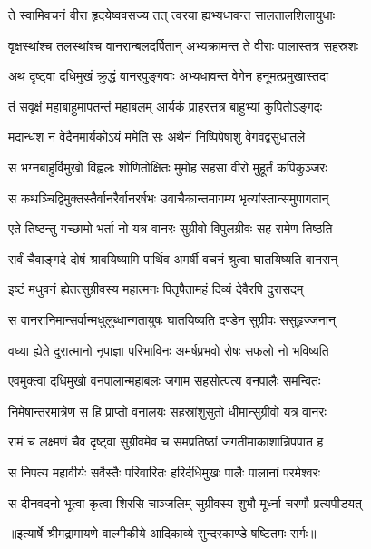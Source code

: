 \twolineshloka
{ते स्वामिवचनं वीरा हृदयेष्ववसज्य तत्}
{त्वरया ह्यभ्यधावन्त सालतालशिलायुधाः} %

\twolineshloka
{वृक्षस्थांश्च तलस्थांश्च वानरान्बलदर्पितान्}
{अभ्यक्रामन्त ते वीराः पालास्तत्र सहस्रशः} %

\twolineshloka
{अथ दृष्ट्वा दधिमुखं क्रुद्धं वानरपुङ्गवाः}
{अभ्यधावन्त वेगेन हनूमत्प्रमुखास्तदा} %

\twolineshloka
{तं सवृक्षं महाबाहुमापतन्तं महाबलम्}
{आर्यकं प्राहरत्तत्र बाहुभ्यां कुपितोऽङ्गदः} %

\twolineshloka
{मदान्धश न वेदैनमार्यकोऽयं ममेति सः}
{अथैनं निष्पिपेषाशु वेगवद्वसुधातले} %

\twolineshloka
{स भग्नबाहुर्विमुखो विह्वलः शोणितोक्षितः}
{मुमोह सहसा वीरो मुहूर्तं कपिकुञ्जरः} %

\twolineshloka
{स कथञ्चिद्विमुक्तस्तैर्वानरैर्वानरर्षभः}
{उवाचैकान्तमागम्य भृत्यांस्तान्समुपागतान्} %

\twolineshloka
{एते तिष्ठन्तु गच्छामो भर्ता नो यत्र वानरः}
{सुग्रीवो विपुलग्रीवः सह रामेण तिष्ठति} %

\twolineshloka
{सर्वं चैवाङ्गदे दोषं श्रावयिष्यामि पार्थिव}
{अमर्षी वचनं श्रुत्वा घातयिष्यति वानरान्} %

\twolineshloka
{इष्टं मधुवनं ह्येतत्सुग्रीवस्य महात्मनः}
{पितृपैतामहं दिव्यं देवैरपि दुरासदम्} %

\twolineshloka
{स वानरानिमान्सर्वान्मधुलुब्धान्गतायुषः}
{घातयिष्यति दण्डेन सुग्रीवः ससुहृज्जनान्} %

\twolineshloka
{वध्या ह्येते दुरात्मानो नृपाज्ञा परिभाविनः}
{अमर्षप्रभवो रोषः सफलो नो भविष्यति} %

\twolineshloka
{एवमुक्त्वा दधिमुखो वनपालान्महाबलः}
{जगाम सहसोत्पत्य वनपालैः समन्वितः} %

\twolineshloka
{निमेषान्तरमात्रेण स हि प्राप्तो वनालयः}
{सहस्रांशुसुतो धीमान्सुग्रीवो यत्र वानरः} %

\twolineshloka
{रामं च लक्ष्मणं चैव दृष्ट्वा सुग्रीवमेव च}
{समप्रतिष्ठां जगतीमाकाशान्निपपात ह} %

\twolineshloka
{स निपत्य महावीर्यः सर्वैस्तैः परिवारितः}
{हरिर्दधिमुखः पालैः पालानां परमेश्वरः} %

\twolineshloka
{स दीनवदनो भूत्वा कृत्वा शिरसि चाञ्जलिम्}
{सुग्रीवस्य शुभौ मूर्ध्ना चरणौ प्रत्यपीडयत्} %


{॥इत्यार्षे श्रीमद्रामायणे वाल्मीकीये आदिकाव्ये सुन्दरकाण्डे षष्टितमः सर्गः॥}

